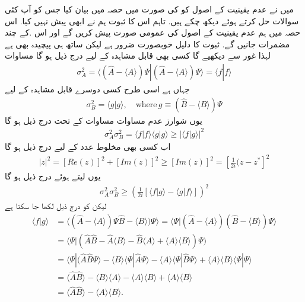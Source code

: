 
میں نے عدم یقینیت کے اصول کو  کی صورت میں حصہ  میں  بیان کیا  جس کو آپ کئی سوالات حل کرتے ہوئے دیکھ چکے ہیں. تاہم اس کا ثبوت ہم نے ابھی پیش نہیں کیا. اس حصہ میں ہم عدم یقینیت کے اصول کی عمومی صورت پیش کریں گے اور اس .کے چند مضمرات جانیں گے. ثبوت کا دلیل خوبصورت ضرور ہے لیکن ساتھ ہی پیچیدہ بھی ہے لہذا غور سے دیکھیے گا
کسی بھی قابل مشاہدہ  کے لیے درج ذیل ہو گا مساوات 
\begin{align*}
\sigma_{A}^{2} = \langle (\hat{A} - \langle A \rangle ) \Psi | (\hat{A} - \langle A \rangle ) \Psi \rangle = \langle f|f \rangle
\end{align*}
جہاں  ہے اسی طرح کسی دوسرے قابل مشاہدہ  کے لیے
\begin{align*}
\sigma_{B}^{2} = \langle g|g \rangle , \quad \text{where}\, g \equiv ( \hat{B} - \langle B \rangle ) \Psi
\end{align*}
یوں شوارز عدم مساوات مساوات   کے تحت درج ذیل ہو گا
\begin{align}
\sigma_{A}^{2} \sigma_{B}^{2} = \langle f|f \rangle \langle g|g \rangle \geq | \langle f|g \rangle |^{2}
\end{align}
اب کسی بھی مخلوط عدد  کے لیے درج ذیل ہو گا 
\begin{align}
|z|^{2} = [Re(z)]^{2} + [Im(z)]^{2} \geq [Im(z)]^{2} = \left[\frac{1}{2i} (z - z^{*} \right]^{2}
\end{align}
یوں  لیتے ہوئے درج ذیل ہو گا
\begin{align}
\sigma_{A}^{2} \sigma_{B}^{2} \geq \left(\frac{1}{2i} [ \langle f|g \rangle - \langle g|f \rangle ] \right)^{2}
\end{align}
لیکن  کو درج ذیل لکھا جا سکتا ہے
\begin{align*}
\langle f|g \rangle &= \langle (\hat{A} - \langle A \rangle )\Psi \hat{B} - \langle B \rangle ) \Psi \rangle = \langle \Psi | ( \hat{A} - \langle A \rangle )(\hat{B}-\langle B \rangle )\Psi \rangle \\
&= \langle \Psi |(\hat{A} \hat{B} - \hat{A} \langle B \rangle -\hat{B} \langle A \rangle + \langle A \rangle \langle B \rangle ) \Psi ) \\
&= \langle \Psi |(\hat{A} \hat{B} \Psi \rangle - \langle B \rangle \langle \Psi | \hat{A} \Psi \rangle - \langle A \rangle \langle \Psi |\hat{B} \Psi \rangle + \langle A \rangle \langle B \rangle  \langle \Psi |\Psi \rangle \\
&= \langle \hat{A}\hat{B} \rangle - \langle B \rangle \langle A \rangle - \langle A \rangle \langle B \rangle  +
\langle A \rangle \langle B \rangle \\
&= \langle \hat{A} \hat{B} \rangle - \langle A \rangle \langle B \rangle .
\end{align*}
